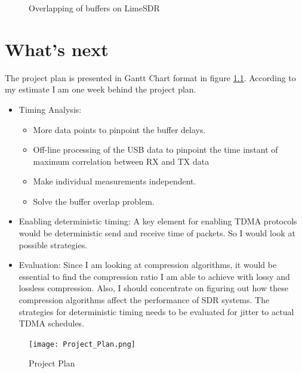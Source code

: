 \documentclass{kththesis}
\begin{document}
\begin{itemize}
{\begin{figure}
\caption{Overlapping of buffers on LimeSDR}
\label{staggering}
\end{figure}
}
\end{itemize}

\chapter{What's next}

The project plan is presented in Gantt Chart format in figure \ref{plan}. According to my estimate I am one week behind the project plan.\\
\begin{itemize}
\item {Timing Analysis:\\
\begin{itemize}
\item {More data points to pinpoint the buffer delays.}
\item {Off-line processing of the USB data to pinpoint the time instant of maximum correlation between RX and TX data}
\item {Make individual measurements independent.}
\item {Solve the buffer overlap problem.}
\end{itemize}}
\item{Enabling deterministic timing: A key element for enabling TDMA protocols would be deterministic send and receive time of packets. So I would look at possible strategies.}
\item{Evaluation: Since I am looking at compression algorithms, it would be essential to find the compression ratio I am able to achieve with lossy and lossless compression. Also, I should concentrate on figuring out how these compression algorithms affect the performance of SDR systems. The strategies for deterministic timing needs to be evaluated for jitter to actual TDMA schedules.}
\end{itemize}
\begin{figure}
\centering
\texttt{[image: Project\_Plan.png]}
\caption{Project Plan}
\label{plan}
\end{figure}

\printbibliography[heading=bibintoc] %

\appendix

\end{document}
